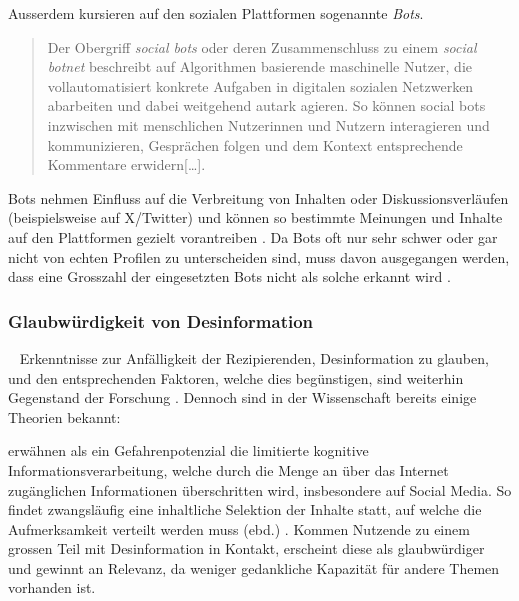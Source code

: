 \documentclass[12pt,a4paper]{article}        %
\begin{document}
Ausserdem kursieren auf den sozialen Plattformen sogenannte \textit{Bots}.
\begin{quote}
  Der Obergriff  \textit{social bots} oder deren Zusammenschluss zu einem \textit{social botnet} beschreibt auf Algorithmen basierende maschinelle Nutzer, die vollautomatisiert konkrete Aufgaben in digitalen sozialen Netzwerken abarbeiten und dabei weitgehend autark agieren. So können social bots inzwischen mit menschlichen Nutzerinnen und Nutzern interagieren und kommunizieren, Gesprächen folgen und dem Kontext entsprechende Kommentare erwidern[\ldots]. \parencite[493f]{behnke_manipulation_2018}
\end{quote}
Bots nehmen Einfluss auf die Verbreitung von Inhalten oder Diskussionsverläufen (beispielsweise auf X/Twitter) und können so bestimmte Meinungen und Inhalte auf den Plattformen gezielt vorantreiben \parencite[495f]{behnke_manipulation_2018}. Da Bots oft nur sehr schwer oder gar nicht von echten Profilen zu unterscheiden sind, muss davon ausgegangen werden, dass eine Grosszahl der eingesetzten Bots nicht als solche erkannt wird \parencite[1095]{lazer_science_2018}.

\subsubsection{Glaubwürdigkeit von Desinformation}
~\label{theory_credibility}
Erkenntnisse zur Anfälligkeit der Rezipierenden, Desinformation zu glauben, und den entsprechenden Faktoren, welche dies begünstigen, sind weiterhin Gegenstand der Forschung \parencites[1094]{lazer_science_2018}[486]{schaewitz_when_2020}. Dennoch sind in der Wissenschaft bereits einige Theorien bekannt:

\textcite[248]{hohlfeld_schlechte_2020} erwähnen als ein Gefahrenpotenzial die limitierte kognitive Informationsverarbeitung, welche durch die Menge an über das Internet zugänglichen Informationen überschritten wird, insbesondere auf Social Media. So findet zwangsläufig eine inhaltliche Selektion der Inhalte statt, auf welche die Aufmerksamkeit verteilt werden muss (ebd.) \parencite[vgl.\ auch][5]{tandoc_jr_facts_2019}. Kommen Nutzende zu einem grossen Teil mit Desinformation in Kontakt, erscheint diese als glaubwürdiger und gewinnt an Relevanz, da weniger gedankliche Kapazität für andere Themen vorhanden ist.
\end{document}
